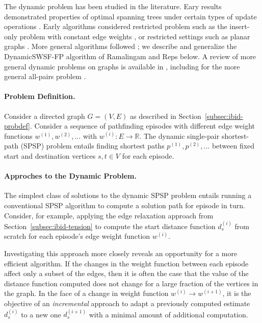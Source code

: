The dynamic problem has been studied in the literature.
Eary results demonstrated properties of optimal spanning trees
under certain types of update operations
\citep{spirapan1975updatingsp}.
Early algorithms considered restricted problem such as
the insert-only problem
with constant edge weights \citep{linchang1991dynamicsp},
or restricted settings such as planar graphs
\citep{klein1998planardynamicshort}.
More general algorithms followed
\citep{ramalingam1996dynamicswsffp,
   frigioni1996dynamicsinglesource,
   frigioni2000dynamicsp};
we describe and generalize the DynamicSWSF-FP algorithm
of Ramalingam and Reps below.
A review of more general dynamic problems on graphs is available
in \citep{eppstein1999dynamic},
including for the more general all-pairs problem
\citep{demetrescu2010dynamic}.

\paragraph{Problem Definition.}
Consider a directed graph $G = (V,E)$ as described in
Section~\ref{subsec:ibid-probdef}.
Consider a sequence of pathfinding episodes
with different edge weight functions $w^{(1)}, w^{(2)}, \dots$
with $w^{(i)} : E \rightarrow \mathbb{R}$.
The dynamic single-pair shortest-path (SPSP) problem
entails finding shortest paths $p^{(1)}, p^{(2)}, \dots$
between fixed start and destination vertices $s,t \in V$
for each episode.

\paragraph{Approches to the Dynamic Problem.}
The simplest class of solutions to the dynamic SPSP problem
entails running a conventional SPSP algorithm to compute a solution
path for episode in turn.
Consider, for example, applying the edge relaxation approach
from Section~\ref{subsec:ibid-tension}
to compute the start distance function $d_s^{(i)}$ from scratch
for each episode's edge weight function $w^{(i)}$.

Investigating this approach more closely reveals an opportunity for
a more efficient algorithm.
If the changes in the weight function between each episode affect
only a subset of the edges,
then it is often the case that the value of the distance function
computed does not change for a large fraction of the vertices in the
graph.
In the face of a change in weight function
$w^{(i)} \rightarrow w^{(i+1)}$,
it is the objective of an \emph{incremental} approach
to adapt a previously computed estimate $d_s^{(i)}$
to a new one $d_s^{(i+1)}$ with a minimal amount of additional
computation.


